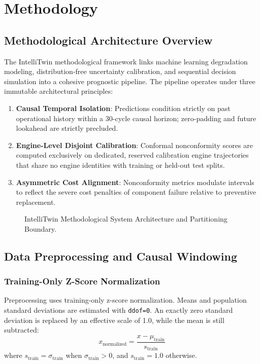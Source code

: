 \chapter{Methodology}
\label{chap:methodology}

\section{Methodological Architecture Overview}
The IntelliTwin methodological framework links machine learning degradation modeling, distribution-free uncertainty calibration, and sequential decision simulation into a cohesive prognostic pipeline. The pipeline operates under three immutable architectural principles:
\begin{enumerate}
    \item \textbf{Causal Temporal Isolation}: Predictions condition strictly on past operational history within a 30-cycle causal horizon; zero-padding and future lookahead are strictly precluded.
    \item \textbf{Engine-Level Disjoint Calibration}: Conformal nonconformity scores are computed exclusively on dedicated, reserved calibration engine trajectories that share no engine identities with training or held-out test splits.
    \item \textbf{Asymmetric Cost Alignment}: Nonconformity metrics modulate intervals to reflect the severe cost penalties of component failure relative to preventive replacement.
\end{enumerate}

\begin{figure}[htbp]
\centering

\caption{IntelliTwin Methodological System Architecture and Partitioning Boundary.}
\label{fig:thesis_architecture}
\end{figure}

\section{Data Preprocessing and Causal Windowing}
\subsection{Training-Only Z-Score Normalization}
Preprocessing uses training-only z-score normalization. Means and population standard deviations are estimated with \texttt{ddof=0}. An exactly zero standard deviation is replaced by an effective scale of 1.0, while the mean is still subtracted:
\begin{equation}
x_{\text{normalized}} = \frac{x - \mu_{\text{train}}}{s_{\text{train}}}
\end{equation}
where $s_{\text{train}} = \sigma_{\text{train}}$ when $\sigma_{\text{train}} > 0$, and $s_{\text{train}} = 1.0$ otherwise.

